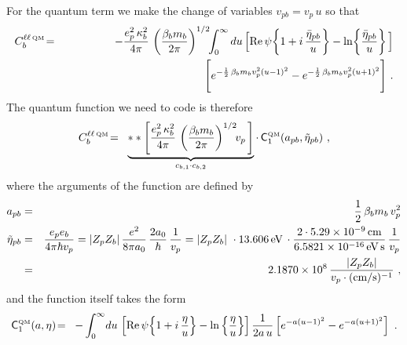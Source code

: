 \documentclass[preprint,12pt,eqsecnum,nofootinbib,amsmath,amssymb]{revtex4}
\newcommand{\smQM}{{\rm\scriptscriptstyle QM}}
\begin{document}
{{For the quantum term we make the change of variables
$v_{pb}= v_p\,u$ so that
\begin{eqnarray}
  C^{\ell\ell \, \smQM}_b
  &\!=\!&  
  -\frac{e_p^2\, \kappa_b^2}{4\pi}\,
  \left( \frac{\beta_b m_b}{2\pi} \right)^{1/2} \!\! 
  \int_0^\infty du\, 
  \Big[{\rm Re}\,\psi\!\left\{ 1 + i\, \frac{\bar\eta_{pb}}{u}
  \right\}
  - \ln\!\left\{\frac{\bar\eta_{pb}}{u} \right\} \Big] 
\nonumber
\\ && \hskip4.5cm
  \Bigg[ e^{-\frac{1}{2}\,\beta_b m_b v_p^2 (u-1)^2} 
  -
  e^{-\frac{1}{2}\,\beta_b m_b v_p^2 (u+1)^2}  
  \Bigg] \ .
\end{eqnarray}
The quantum function we need to code is therefore
\begin{eqnarray}
  C^{\ell \ell \, \smQM}_b
  &\!=\!&  
  \underbrace{
  **
  \left[\frac{e_p^2\, \kappa_b^2}{4\pi}\,
  \left( \frac{\beta_b m_b}{2\pi} \right)^{1/2} \!\! v_p\,
  \right] 
  }_{c_{b, 1} \cdot c_{b, 2}}
  \cdot \,
  {\sf C}_1^\smQM(a_{pb}, \tilde\eta_{pb}) \ ,
\label{qmA}
\end{eqnarray}
where the arguments of the function are defined by 
\begin{eqnarray}
  a_{pb} 
  &=& 
  \frac{1}{2}\,\beta_b m_b\, v_p^2
\\
  \tilde\eta_{pb}
  &=& 
  \frac{e_p e_b}{4 \pi \hbar v_p}
  =
  \vert Z_p Z_b\vert\,\frac{e^2}{8 \pi a_0}\,\frac{2 a_0}{\hbar}\,
  \frac{1}{v_p}
  =
  \vert Z_p Z_b\vert\ \cdot 13.606\,{\rm eV}\,\cdot
  \frac{2 \cdot 5.29 \times 10^{-9}\,{\rm cm}}{6.5821 \times
  10^{-16}\,{\rm eV\,s}}\,
  \frac{1}{v_p}
\nonumber
\\
  &=&
  2.1870 \times 10^8 \, \frac{\vert Z_p Z_b\vert}{v_p
  \cdot ({\rm cm/s})^{-1}} \ ,
\end{eqnarray}
and the function itself takes the form
\begin{eqnarray}
  {\sf C}_1^\smQM(a,\eta)
  &\!=\!&  
  -\int_0^\infty \! du\, 
  \left[{\rm Re}\,\psi\! \left\{1 + i\, \frac{\eta}{u} \right\} - 
  \ln\left\{ \frac{\eta}{u}  \right\} \right]
  \frac{1}{2 a\,u}\left[e^{-a(u-1)^2} - e^{-a(u+1)^2} 
  \right] \ .
\label{qmAB}
\end{eqnarray}


}}
\end{document}
